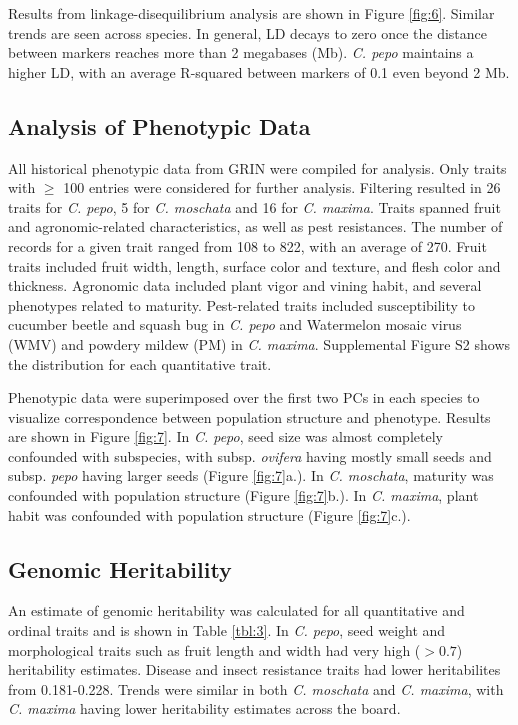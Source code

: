 \documentclass[utf8]{FrontiersinHarvard} %
\begin{document}
Results from linkage-disequilibrium analysis are shown in Figure \ref{fig:6}. Similar trends are seen across species. In general, LD decays to zero once the distance between markers reaches more than 2 megabases (Mb). \textit{C. pepo} maintains a higher LD, with an average R-squared between markers of 0.1 even beyond 2 Mb. 

\subsection{Analysis of Phenotypic Data}
All  historical phenotypic data from GRIN were compiled for analysis. Only traits with $\geq$ 100 entries were considered for further analysis. Filtering resulted in 26 traits for \textit{C. pepo}, 5 for \textit{C. moschata} and 16 for \textit{C. maxima}. Traits spanned fruit and agronomic-related characteristics, as well as pest resistances. The number of records for a given trait ranged from 108 to 822, with an average of  270. Fruit traits included fruit width, length, surface color and texture, and flesh color and thickness. Agronomic data included plant vigor and vining habit, and several phenotypes related to maturity. Pest-related traits included susceptibility to cucumber beetle and squash bug in \textit{C. pepo} and Watermelon mosaic virus (WMV) and powdery mildew (PM) in \textit{C. maxima}. {\color{red} Supplemental Figure S2} shows the distribution for each quantitative trait. 

Phenotypic data were superimposed over the first two PCs in each species to visualize correspondence between population structure and phenotype. Results are shown in Figure \ref{fig:7}. In \textit{C. pepo}, seed size was almost completely confounded with subspecies, with subsp. \textit{ovifera} having mostly small seeds and subsp. \textit{pepo} having larger seeds (Figure \ref{fig:7}a.). In \textit{C. moschata}, maturity was confounded with population structure (Figure \ref{fig:7}b.).  In \textit{C. maxima}, plant habit was confounded with population structure (Figure \ref{fig:7}c.).

\subsection{Genomic Heritability}

An estimate of genomic heritability was calculated for all quantitative and ordinal traits and is shown in Table \ref{tbl:3}. In \textit{C. pepo}, seed weight and morphological traits such as fruit length and width had very high ($>0.7$) heritability estimates. Disease and insect resistance traits had lower heritabilites from 0.181-0.228. Trends were similar in both \textit{C. moschata} and \textit{C. maxima}, with \textit{C. maxima} having lower heritability estimates across the board. 
\end{document}

